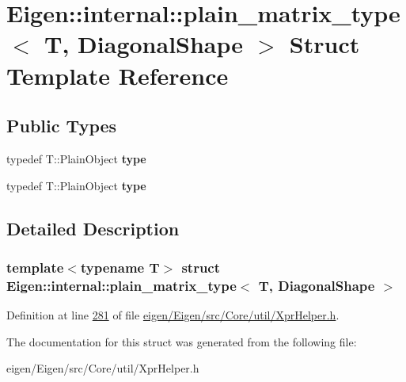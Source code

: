 \hypertarget{struct_eigen_1_1internal_1_1plain__matrix__type_3_01_t_00_01_diagonal_shape_01_4}{}\section{Eigen\+:\+:internal\+:\+:plain\+\_\+matrix\+\_\+type$<$ T, Diagonal\+Shape $>$ Struct Template Reference}
\label{struct_eigen_1_1internal_1_1plain__matrix__type_3_01_t_00_01_diagonal_shape_01_4}
\subsection*{Public Types}
\begin{DoxyCompactItemize}
\item 
\mbox{\label{struct_eigen_1_1internal_1_1plain__matrix__type_3_01_t_00_01_diagonal_shape_01_4_a92afd71e20eff907c95e7262e42a9b71}} 
typedef T\+::\+Plain\+Object {\bfseries type}
\item 
\mbox{\label{struct_eigen_1_1internal_1_1plain__matrix__type_3_01_t_00_01_diagonal_shape_01_4_a92afd71e20eff907c95e7262e42a9b71}} 
typedef T\+::\+Plain\+Object {\bfseries type}
\end{DoxyCompactItemize}


\subsection{Detailed Description}
\subsubsection*{template$<$typename T$>$\newline
struct Eigen\+::internal\+::plain\+\_\+matrix\+\_\+type$<$ T, Diagonal\+Shape $>$}



Definition at line \hyperlink{eigen_2_eigen_2src_2_core_2util_2_xpr_helper_8h_source_l00281}{281} of file \hyperlink{eigen_2_eigen_2src_2_core_2util_2_xpr_helper_8h_source}{eigen/\+Eigen/src/\+Core/util/\+Xpr\+Helper.\+h}.



The documentation for this struct was generated from the following file\+:\begin{DoxyCompactItemize}
\item 
eigen/\+Eigen/src/\+Core/util/\+Xpr\+Helper.\+h\end{DoxyCompactItemize}
